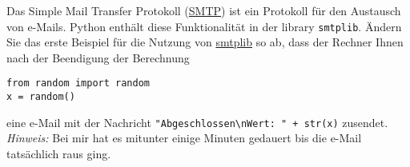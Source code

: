 Das Simple Mail Transfer Protokoll (\href{https://de.wikipedia.org/wiki/Simple_Mail_Transfer_Protocol}{SMTP}) ist ein Protokoll für den Austausch von e-Mails. Python enthält diese Funktionalität in der library \verb|smtplib|. Ändern Sie das erste Beispiel für die Nutzung von \href{https://docs.python.org/3/library/email.examples.html}{smtplib} so ab, dass der Rechner Ihnen nach der Beendigung der Berechnung 
\begin{lstlisting}
from random import random 
x = random()
\end{lstlisting}
eine e-Mail mit der Nachricht \verb|"Abgeschlossen\nWert: " + str(x)| zusendet. \\

\textit{Hinweis: } Bei mir hat es mitunter einige Minuten gedauert bis die e-Mail tatsächlich raus ging.